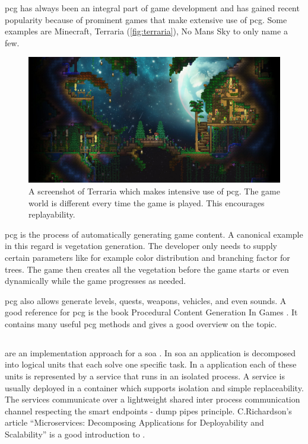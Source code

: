 \gls{pcg} has always been an integral part of game
development and has gained recent popularity because of prominent games that
make extensive use of \gls{pcg}. Some examples are Minecraft, Terraria
(\autoref{fig:terraria}), No Mans Sky to only name a few.

\begin{figure}
	\centering
	\includegraphics[width=\textwidth]{images/terraria}
	\caption{A screenshot of Terraria which makes intensive use of \gls{pcg}. The game
	world is different every time the game is played. This encourages
	replayability.}
	\label{fig:terraria}
\end{figure}

\gls{pcg} is the process of automatically generating game content. A canonical
example in this regard is vegetation generation. The developer only needs to
supply certain parameters like for example color distribution and branching
factor for trees. The game then creates all the vegetation before the game
starts or even dynamically while the game progresses as needed.

\gls{pcg} also allows generate levels, quests, weapons, vehicles, and even
sounds. A good reference for \gls{pcg} is the book Procedural Content Generation In
Games \cite{shaker2014procedural}. It contains many useful \gls{pcg} methods and
gives a good overview on the topic.

\subsection{\mssuc{}}

\mssuc{} are an implementation approach for a \gls{soa}
\cite{zimmermann2016microservices}. In \gls{soa} an application is decomposed
into logical units that each solve one specific task. In a \ms{} application
each of these units is represented by a service that runs in an isolated
process. A service is usually deployed in a container which supports isolation
and simple replaceability. The services communicate over a lightweight shared
inter process communication channel respecting the smart endpoints - dump pipes
principle. C.Richardson's article ``Microservices: Decomposing Applications for
Deployability and Scalability'' \cite{richardson2014mss} is a good introduction to
\mss{}.

